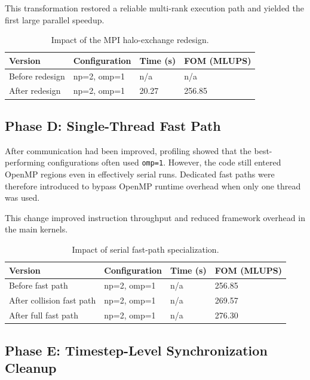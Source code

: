 \documentclass[11pt,a4paper]{article}
\begin{document}
This transformation restored a reliable multi-rank execution path and yielded the first large parallel speedup.

\begin{table}[H]
  \centering
  \caption{Impact of the MPI halo-exchange redesign.}
  \label{tab:mpi-redesign-results}
  \begin{tabular}{@{}llll@{}}
    \toprule
    Version & Configuration & Time (s) & FOM (MLUPS) \\
    \midrule
    Before redesign & np=2, omp=1 & n/a & n/a \\
    After redesign & np=2, omp=1 & 20.27 & 256.85 \\
    \bottomrule
  \end{tabular}
\end{table}

\subsection{Phase D: Single-Thread Fast Path}

After communication had been improved, profiling showed that the best-performing configurations often used \texttt{omp=1}. However, the code still entered OpenMP regions even in effectively serial runs. Dedicated fast paths were therefore introduced to bypass OpenMP runtime overhead when only one thread was used.

This change improved instruction throughput and reduced framework overhead in the main kernels.

\begin{table}[H]
  \centering
  \caption{Impact of serial fast-path specialization.}
  \label{tab:fast-path-results}
  \begin{tabular}{@{}llll@{}}
    \toprule
    Version & Configuration & Time (s) & FOM (MLUPS) \\
    \midrule
    Before fast path & np=2, omp=1 & n/a & 256.85 \\
    After collision fast path & np=2, omp=1 & n/a & 269.57 \\
    After full fast path & np=2, omp=1 & n/a & 276.30 \\
    \bottomrule
  \end{tabular}
\end{table}

\subsection{Phase E: Timestep-Level Synchronization Cleanup}
\end{document}
